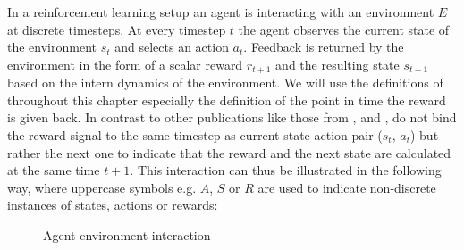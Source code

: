 In a reinforcement learning setup an agent is interacting with an environment $E$ at discrete timesteps. At every timestep $t$ the agent observes the current state of the environment $s_t$ and selects an action $a_t$. Feedback is returned by the environment in the form of a scalar reward $r_{t+1}$ and the resulting state $s_{t+1}$ based on the intern dynamics of the environment. We will use the definitions of \cite{Sutton1998} throughout this chapter especially the definition of the point in time the reward is given back. In contrast to other publications like those from \cite{zare2021continuous}, \cite{wiering2012reinforcement} and \cite{lillicrap2019continuous}, \cite{Sutton1998} do not bind the reward signal to the same timestep as current state-action pair ($s_t$, $a_t$) but rather the next one to indicate that the reward and the next state are calculated at the same time $t+1$.
This interaction can thus be illustrated in the following way, where uppercase symbols e.g. $A$, $S$ or $R$ are used to indicate non-discrete instances of states, actions or rewards:
\begin{figure}[H]
    \centering
    \hspace*{1cm}%
    \caption{Agent-environment interaction}
    \label{fig:rlEnvironment}
\end{figure}



